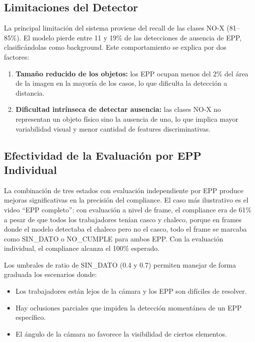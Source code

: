 \documentclass[conference, 10pt]{IEEEtran}
\begin{document}
\subsection{Limitaciones del Detector}

La principal limitación del sistema proviene del recall de las clases NO-X (81--85\%). El modelo pierde entre 11 y 19\% de las detecciones de ausencia de EPP, clasificándolas como background. Este comportamiento se explica por dos factores:

\begin{enumerate}
    \item \textbf{Tamaño reducido de los objetos:} los EPP ocupan menos del 2\% del área de la imagen en la mayoría de los casos, lo que dificulta la detección a distancia.
    \item \textbf{Dificultad intrínseca de detectar ausencia:} las clases NO-X no representan un objeto físico sino la ausencia de uno, lo que implica mayor variabilidad visual y menor cantidad de features discriminativas.
\end{enumerate}

\subsection{Efectividad de la Evaluación por EPP Individual}

La combinación de tres estados con evaluación independiente por EPP produce mejoras significativas en la precisión del compliance. El caso más ilustrativo es el video ``EPP completo'': con evaluación a nivel de frame, el compliance era de 61\% a pesar de que todos los trabajadores tenían casco y chaleco, porque en frames donde el modelo detectaba el chaleco pero no el casco, todo el frame se marcaba como SIN\_DATO o NO\_CUMPLE para ambos EPP. Con la evaluación individual, el compliance alcanza el 100\% esperado.

Los umbrales de ratio de SIN\_DATO (0.4 y 0.7) permiten manejar de forma graduada los escenarios donde:

\begin{itemize}
    \item Los trabajadores están lejos de la cámara y los EPP son difíciles de resolver.
    \item Hay oclusiones parciales que impiden la detección momentánea de un EPP específico.
    \item El ángulo de la cámara no favorece la visibilidad de ciertos elementos.
\end{itemize}
\end{document}
